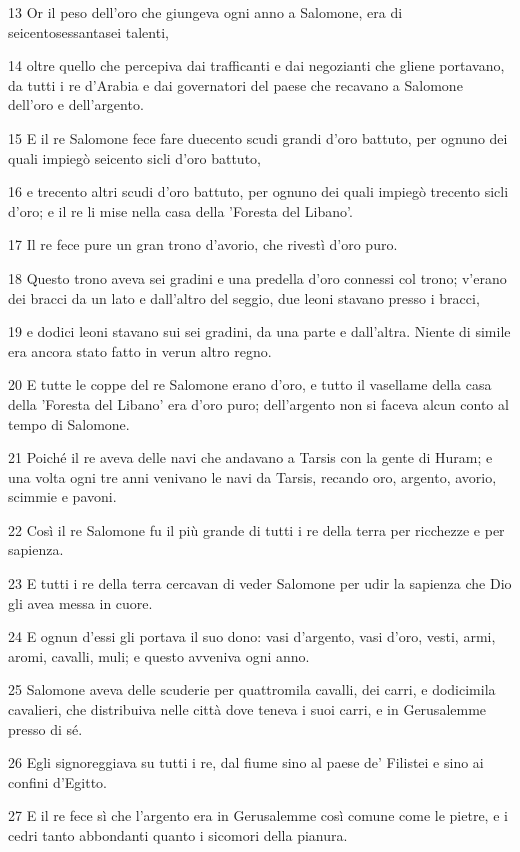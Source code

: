 \par 13 Or il peso dell'oro che giungeva ogni anno a Salomone, era di seicentosessantasei talenti,
\par 14 oltre quello che percepiva dai trafficanti e dai negozianti che gliene portavano, da tutti i re d'Arabia e dai governatori del paese che recavano a Salomone dell'oro e dell'argento.
\par 15 E il re Salomone fece fare duecento scudi grandi d'oro battuto, per ognuno dei quali impiegò seicento sicli d'oro battuto,
\par 16 e trecento altri scudi d'oro battuto, per ognuno dei quali impiegò trecento sicli d'oro; e il re li mise nella casa della 'Foresta del Libano'.
\par 17 Il re fece pure un gran trono d'avorio, che rivestì d'oro puro.
\par 18 Questo trono aveva sei gradini e una predella d'oro connessi col trono; v'erano dei bracci da un lato e dall'altro del seggio, due leoni stavano presso i bracci,
\par 19 e dodici leoni stavano sui sei gradini, da una parte e dall'altra. Niente di simile era ancora stato fatto in verun altro regno.
\par 20 E tutte le coppe del re Salomone erano d'oro, e tutto il vasellame della casa della 'Foresta del Libano' era d'oro puro; dell'argento non si faceva alcun conto al tempo di Salomone.
\par 21 Poiché il re aveva delle navi che andavano a Tarsis con la gente di Huram; e una volta ogni tre anni venivano le navi da Tarsis, recando oro, argento, avorio, scimmie e pavoni.
\par 22 Così il re Salomone fu il più grande di tutti i re della terra per ricchezze e per sapienza.
\par 23 E tutti i re della terra cercavan di veder Salomone per udir la sapienza che Dio gli avea messa in cuore.
\par 24 E ognun d'essi gli portava il suo dono: vasi d'argento, vasi d'oro, vesti, armi, aromi, cavalli, muli; e questo avveniva ogni anno.
\par 25 Salomone aveva delle scuderie per quattromila cavalli, dei carri, e dodicimila cavalieri, che distribuiva nelle città dove teneva i suoi carri, e in Gerusalemme presso di sé.
\par 26 Egli signoreggiava su tutti i re, dal fiume sino al paese de' Filistei e sino ai confini d'Egitto.
\par 27 E il re fece sì che l'argento era in Gerusalemme così comune come le pietre, e i cedri tanto abbondanti quanto i sicomori della pianura.

